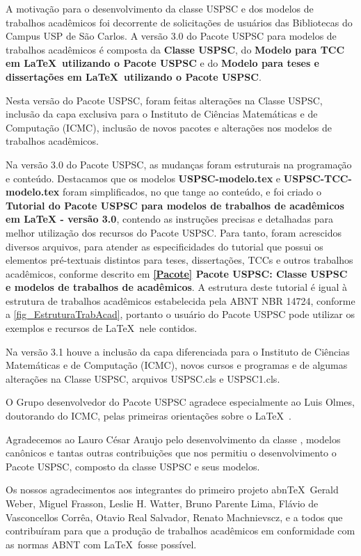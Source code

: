 \begin{agradecimentos}
	A motivação para o desenvolvimento da classe USPSC e dos modelos de trabalhos acadêmicos foi decorrente de solicitações de usuários das Bibliotecas do Campus USP de São Carlos. A versão 3.0 do Pacote USPSC para modelos de trabalhos acadêmicos é composta da \textbf{Classe USPSC}, do \textbf{Modelo para TCC em \LaTeX\ utilizando o Pacote USPSC} e do \textbf{Modelo para teses e dissertações em \LaTeX\ utilizando o Pacote USPSC}.
	
	Nesta versão do Pacote USPSC, foram feitas alterações na Classe USPSC, inclusão da capa exclusiva para o Instituto de Ciências Matemáticas e de Computação (ICMC), inclusão de novos pacotes e alterações nos modelos de trabalhos acadêmicos.
	
	Na versão 3.0 do Pacote USPSC, as mudanças foram estruturais na programação e conteúdo. Destacamos que os modelos \textbf{USPSC-modelo.tex} e \textbf{USPSC-TCC-modelo.tex} foram simplificados, no que tange ao conteúdo, e foi criado o \textbf{Tutorial do Pacote USPSC para modelos de trabalhos de acad\^emicos em LaTeX - vers\~ao 3.0}, contendo as instruções precisas e detalhadas para melhor utilização dos recursos do Pacote USPSC. Para tanto, foram acrescidos diversos arquivos, para atender as especificidades do tutorial que possui os elementos pré-textuais distintos para teses, dissertações, TCCs e outros trabalhos acadêmicos, conforme descrito em  \textbf{\ref{Pacote} Pacote USPSC: Classe USPSC e modelos de trabalhos de acadêmicos}. A estrutura deste tutorial é igual à  estrutura de trabalhos acadêmicos estabelecida pela ABNT NBR 14724, conforme a \autoref{fig_EstruturaTrabAcad}, portanto o usuário do Pacote USPSC pode utilizar os exemplos e recursos de \LaTeX\ nele contidos.	
	 
	Na versão 3.1 houve a inclusão da capa diferenciada para o Instituto de Ciências Matemáticas e de Computação (ICMC), novos cursos e programas e de algumas alterações na Classe USPSC, arquivos USPSC.cls e  USPSC1.cls.
	
	O Grupo desenvolvedor do Pacote USPSC agradece especialmente ao Luis Olmes, doutorando do ICMC, pelas primeiras orientações sobre o \LaTeX\ . 
	
	Agradecemos ao Lauro César Araujo pelo desenvolvimento da classe  \abnTeX, modelos canônicos e tantas outras contribuições que nos permitiu o desenvolvimento o Pacote USPSC, composto da classe USPSC e seus modelos.
	
	Os nossos agradecimentos aos integrantes do primeiro
	projeto abn\TeX\, Gerald Weber, Miguel Frasson, Leslie H. Watter, Bruno Parente Lima, Flávio de Vasconcellos Corrêa, Otavio Real
	Salvador, Renato Machnievscz, e a todos que contribuíram para que a produção de trabalhos acadêmicos em conformidade com
	as normas ABNT com \LaTeX\ fosse possível.
	

\end{agradecimentos}
